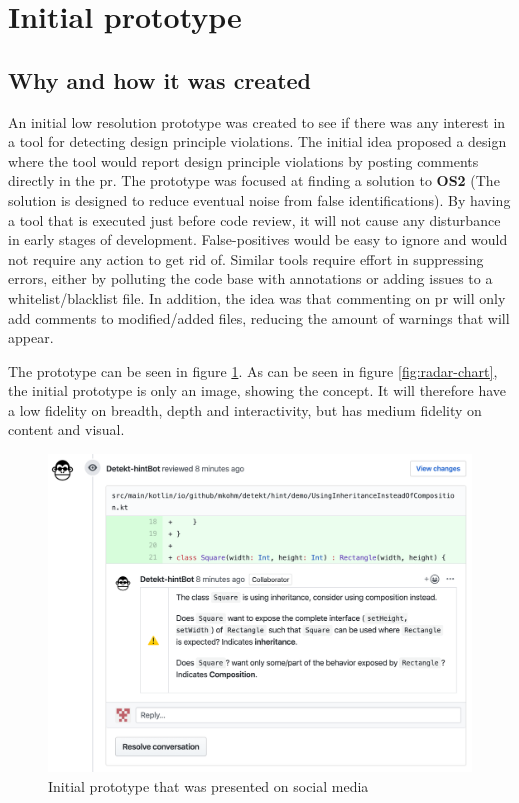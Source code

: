 \documentclass{report}
\begin{document}
\section{Initial prototype}
\subsection*{Why and how it was created}
An initial low resolution prototype was created to see if there was any interest in a tool for detecting design principle violations. The initial idea proposed a design where the tool would report design principle violations by posting comments directly in the \gls{pr}. The prototype was focused at finding a solution to \textbf{OS2} (The solution is designed to reduce eventual noise from false identifications). By having a tool that is executed just before code review, it will not cause any disturbance in early stages of development. False-positives would be easy to ignore and would not require any action to get rid of. Similar tools require effort in suppressing errors, either by polluting the code base with annotations or adding issues to a whitelist/blacklist file. In addition, the idea was that commenting on \gls{pr} will only add comments to modified/added files, reducing the amount of warnings that will appear.  


The prototype can be seen in figure \ref{fig:mockup}. As can be seen in figure \ref{fig:radar-chart}, the initial prototype is only an image, showing the concept. It will therefore have a low fidelity on breadth, depth and interactivity, but has medium fidelity on content and visual. 


\begin{figure}[h!]
    \centering
    \includegraphics[width=\textwidth]{../images/demo.png}
    \caption{Initial prototype that was presented on social media}
    \label{fig:mockup}
\end{figure}
\end{document}
